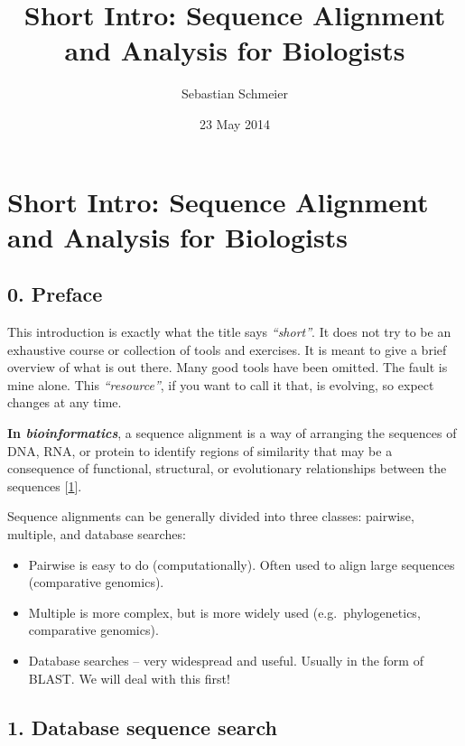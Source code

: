 \documentclass[]{article}
\begin{document}
\title{Short Intro: Sequence Alignment and Analysis for Biologists}
\author{Sebastian Schmeier}
\date{23 May 2014}
\maketitle

\section{Short Intro: Sequence Alignment and Analysis for
Biologists}\label{short-intro-sequence-alignment-and-analysis-for-biologists}

\subsection{0. Preface}\label{preface}

This introduction is exactly what the title says \emph{``short''}. It
does not try to be an exhaustive course or collection of tools and
exercises. It is meant to give a brief overview of what is out there.
Many good tools have been omitted. The fault is mine alone. This
\emph{``resource''}, if you want to call it that, is evolving, so expect
changes at any time.

\textbf{In \emph{bioinformatics}}, a sequence alignment is a way of
arranging the sequences of DNA, RNA, or protein to identify regions of
similarity that may be a consequence of functional, structural, or
evolutionary relationships between the sequences
{[}\href{http://www.cshlpress.com/default.tpl?cart=14004538673655488\&fromlink=T\&linkaction=full\&linksortby=oop_title\&--eqSKUdatarq=466}{1}{]}.

Sequence alignments can be generally divided into three classes:
pairwise, multiple, and database searches:

\begin{itemize}
\itemsep1pt\parskip0pt
\item
  Pairwise is easy to do (computationally). Often used to align large
  sequences (comparative genomics).
\item
  Multiple is more complex, but is more widely used (e.g.~phylogenetics,
  comparative genomics).
\item
  Database searches -- very widespread and useful. Usually in the form
  of BLAST. We will deal with this first!
\end{itemize}

\subsection{1. Database sequence search}\label{database-sequence-search}
\end{document}
